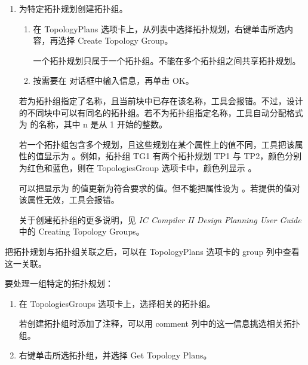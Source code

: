 \begin{enumerate}
  创建时，全部拓扑规划都被分配到默认拓扑组 。group 列显示该拓扑规划所关联的拓扑组。也可以在拓扑规划上右键单击，并从上下文相关菜单选择 Get Topology Group，查看它所属的拓扑组。

  用下列步骤把拓扑规划重新分配到指定的拓扑组。

  \item 为特定拓扑规划创建拓扑组。
  \begin{enumerate}[label=\alph*.]
    \item 在 TopologyPlans 选项卡上，从列表中选择拓扑规划，右键单击所选内容，再选择 Create Topology Group。

    一个拓扑规划只属于一个拓扑组。不能在多个拓扑组之间共享拓扑规划。
    \item 按需要在  对话框中输入信息，再单击 OK。
  \end{enumerate}

  若为拓扑组指定了名称，且当前块中已存在该名称，工具会报错。不过，设计的不同块中可以有同名的拓扑组。若不为拓扑组指定名称，工具自动分配格式为  的名称，其中 n 是从 1 开始的整数。

  \begin{noteBox}
  若一个拓扑组包含多个规划，且这些规划在某个属性上的值不同，工具把该属性的值显示为 。例如，拓扑组 TG1 有两个拓扑规划 TP1 与 TP2，颜色分别为红色和蓝色，则在 TopologiesGroup 选项卡中，颜色列显示 。

  可以把显示为  的值更新为符合要求的值。但不能把属性设为 。若提供的值对该属性无效，工具会报错。
  \end{noteBox}

  \begin{seeAlsoBox}
  关于创建拓扑组的更多说明，见 \emph{IC Compiler II Design Planning User Guide} 中的 Creating Topology Groups。
  \end{seeAlsoBox}
\end{enumerate}

把拓扑规划与拓扑组关联之后，可以在 TopologyPlans 选项卡的 group 列中查看这一关联。

要处理一组特定的拓扑规划：
\begin{enumerate}
  \item 在 TopologiesGroups 选项卡上，选择相关的拓扑组。

  若创建拓扑组时添加了注释，可以用 comment 列中的这一信息挑选相关拓扑组。
  \item 右键单击所选拓扑组，并选择 Get Topology Plans。
\end{enumerate}

